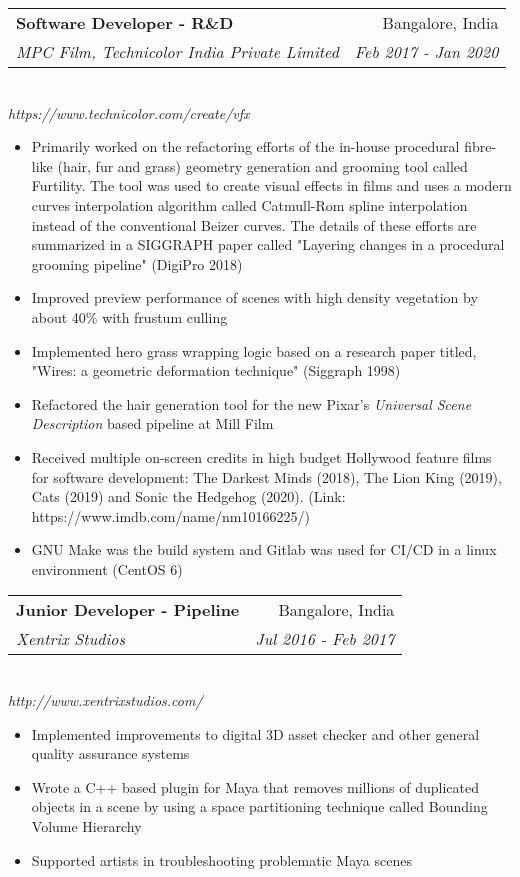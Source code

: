 \documentclass[a4paper,11pt]{article}
\makeatletter
\newcommand{\resumeSubheading}[4]{
  \vspace{-1pt}\item
    \begin{tabular*}{0.97\textwidth}[t]{l@{\extracolsep{\fill}}r}
      \textbf{#1} & #2 \\
      \textit{\small#3} & \textit{\small #4} \\
    \end{tabular*}
    \vspace{-5pt}
}
\newcommand{\resumeItemListStart}{
  \begin{itemize}
}
\newcommand{\resumeItemListEnd}{
  \end{itemize}
  \vspace{-5pt}
}
\makeatother
\begin{document}
      \resumeSubheading
        {Software Developer - R\&D}
        {Bangalore, India}
        {MPC Film, Technicolor India Private Limited}
        {Feb 2017 - Jan 2020} \\
        \vspace{3pt}
        \textit{\small{https://www.technicolor.com/create/vfx}}

        \resumeItemListStart
            \item\small{{Primarily worked on the refactoring efforts of the in-house procedural fibre-like (hair, fur and grass) geometry generation and grooming tool called Furtility. The tool was used to create visual effects in films and uses a modern curves interpolation algorithm called Catmull-Rom spline interpolation instead of the conventional Beizer curves. The details of these efforts are summarized in a SIGGRAPH paper called "Layering changes in a procedural grooming pipeline" (DigiPro 2018) }}
            \item\small{{Improved preview performance of scenes with high density vegetation by about 40\% with frustum culling }}
            \item\small{{Implemented hero grass wrapping logic based on a research paper titled, "Wires: a geometric deformation technique" (Siggraph 1998) }}
            \item\small{{Refactored the hair generation tool for the new Pixar's \emph{Universal Scene Description} based pipeline at Mill Film }}
            \item\small{{Received multiple on-screen credits in high budget Hollywood feature films for software development: The Darkest Minds (2018), The Lion King (2019), Cats (2019) and Sonic the Hedgehog (2020). (Link: https://www.imdb.com/name/nm10166225/)}}
            \item\small{{GNU Make was the build system and Gitlab was used for CI/CD in a linux environment (CentOS 6) }}
        \resumeItemListEnd

      \resumeSubheading
        {Junior Developer - Pipeline}
        {Bangalore, India}
        {Xentrix Studios}
        {Jul 2016 - Feb 2017} \\
        \vspace{3pt}
        \textit{\small{http://www.xentrixstudios.com/}}

        \resumeItemListStart
          \item\small{{Implemented improvements to digital 3D asset checker and other general quality assurance systems}}
          \item\small{{Wrote a C++ based plugin for Maya that removes millions of duplicated objects in a scene by using a space partitioning technique called Bounding Volume Hierarchy}}
          \item\small{{Supported artists in troubleshooting problematic Maya scenes}}
        \resumeItemListEnd
\end{document}
